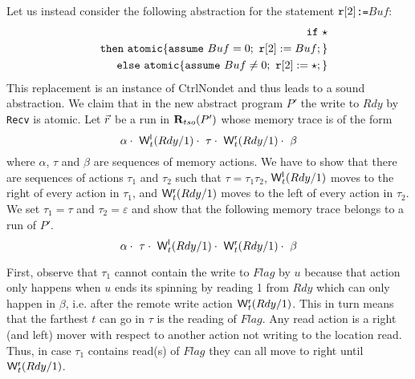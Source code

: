 \documentclass[preprint,9pt]{sigplanconf}
\begin{document}
Let us instead consider the following abstraction for the statement {\tt $\mathtt{r}[2]$:=$Buf$}:
\begin{eqnarray*}
&&\mathtt{if}\ {\star}\\
&&\mathtt{then}\ \mathtt{atomic}\{\mathtt{assume}\ Buf=0;\ \mathtt{r}[2]:=Buf;\}\\
&&\mathtt{else}\ \mathtt{atomic}\{\mathtt{assume}\ Buf\neq0;\ \mathtt{r}[2]:=\star;\}
\end{eqnarray*}
This replacement is an instance of {\sc\small CtrlNondet} and thus leads to a sound abstraction.
We claim that in the new abstract program $P'$ the write to $Rdy$ by {\tt Recv} is atomic.
Let $\vec{r}$ be a run in $\mathbf{R}_{tso}(P')$ whose memory trace is of the form
\[
\alpha\cdot\ \mathsf{W}^{\mathsf{l}}_{t}(Rdy/1)\cdot\ \tau\cdot\ \mathsf{W}^{\mathsf{r}}_{t}(Rdy/1)\cdot\ \beta
\]
where $\alpha$, $\tau$ and $\beta$ are sequences of memory actions.
We have to show that there are sequences of actions $\tau_1$ and $\tau_2$ such that $\tau=\tau_1\tau_2$, $\mathsf{W}^{\mathsf{l}}_{t}(Rdy/1)$ moves to the right of every action in $\tau_1$, and $\mathsf{W}^{\mathsf{r}}_{t}(Rdy/1)$ moves to the left of every action in $\tau_2$. 
We set $\tau_1=\tau$ and $\tau_2=\varepsilon$ and show that the following memory trace belongs to a run of $P'$.
\[
\alpha\cdot\ \tau\cdot\ \mathsf{W}^{\mathsf{l}}_{t}(Rdy/1)\cdot\ \mathsf{W}^{\mathsf{r}}_{t}(Rdy/1)\cdot\ \beta
\]

First, observe that $\tau_1$ cannot contain the write to $Flag$ by $u$ because that action only happens when $u$ ends its spinning by reading 1 from $Rdy$ which can only happen in $\beta$, i.e. after the remote write action $\mathsf{W}^{\mathsf{r}}_{t}(Rdy/1)$.
This in turn means that the farthest $t$ can go in $\tau$ is the reading of $Flag$.
Any read action is a right (and left) mover with respect to another action not writing to the location read.
Thus, in case $\tau_1$ contains read(s) of $Flag$ they can all move to right until $\mathsf{W}^{\mathsf{r}}_{t}(Rdy/1)$.
\end{document}
